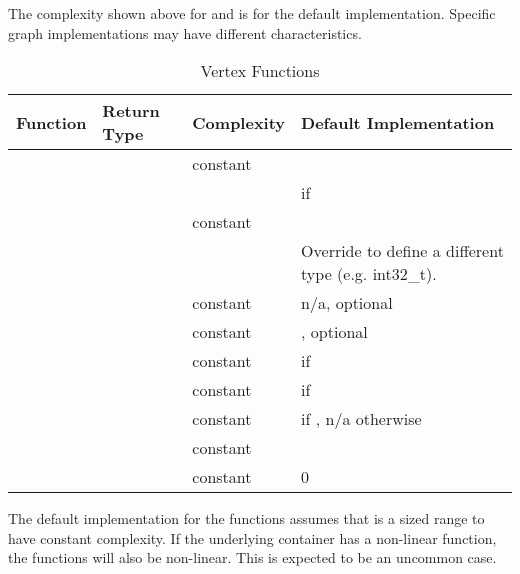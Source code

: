 The complexity shown above for  and  is for the default
implementation. Specific graph implementations may have different characteristics.

\begin{table}[h!]
\begin{center}
\resizebox{\textwidth}{!}
{\begin{tabular}{l l p{1.5cm} L{7.0cm}}
\hline
    \textbf{Function} & \textbf{Return Type} & \textbf{Complexity} & \textbf{Default Implementation} \\
\hline
     &  & constant &  \\
    & & & if   \\
     &  & constant &  \\
    & & & Override to define a different  type (e.g. int32\_t). \\
     &  & constant & n/a, optional \\
     &  & constant & , optional \\
     &  & constant &  if  \\
     &  & constant &  if  \\
     &  & constant &  if , n/a otherwise \\
     &  & constant &  \\
\hdashline
     &  & constant & 0 \\
\hline
\end{tabular}}
\caption{Vertex Functions}
\label{tab:vertex_func}
\end{center}
\end{table}

The default implementation for the  functions assumes that  is a sized range
to have constant complexity. If the underlying container has a non-linear  function, the  functions will 
also be non-linear. This is expected to be an uncommon case.

